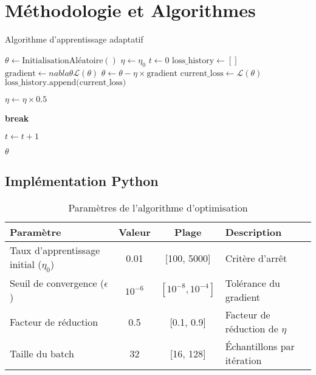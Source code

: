 \chapter{Méthodologie et Algorithmes}

\begin{algorithm}[H]
	\caption{Algorithme d'apprentissage adaptatif}
	\begin{algorithmic}[1]
			\State $\theta \gets \text{InitialisationAléatoire}()$
			\State $\eta \gets \eta_0$
			\State $t \gets 0$
			\State $\text{loss\_history} \gets []$
				\State $\text{gradient} \gets nabla\theta \mathcal{L}(\theta)$
				\State $\theta \gets \theta - \eta \times \text{gradient}$
				\State $\text{current\_loss} \gets \mathcal{L}(\theta)$
				\State $\text{loss\_history.append(current\_loss)}$	
							
					\State $\eta \gets \eta \times 0.5$ 
				\EndIf
				
					\State \textbf{break} 
				\EndIf
				
				\State $t \gets t+ 1$
			\EndWhile
			
			\State \Return $\theta$
		\EndProcedure
	\end{algorithmic}
	\label{alg:adaptive-optimization}
\end{algorithm}

\section{Implémentation Python}



\begin{table}[H]
	\centering
	\caption{Paramètres de l'algorithme d'optimisation}
	\begin{tabular}{p{6cm}ccp{4cm}}
		\toprule
		\textbf{Paramètre} & \textbf{Valeur} & \textbf{Plage} & \textbf{Description} \\
		\midrule
		Taux d'apprentissage initial ($\eta_0$) & 0.01 & [100, 5000] & Critère d'arrêt \\
		Seuil de convergence ($\epsilon$) & $10^{-6}$ & $[10^{-8}, 10^{-4}]$ & Tolérance du gradient \\
		Facteur de réduction & 0.5 & [0.1, 0.9] & Facteur de réduction de $\eta$ \\
		Taille du batch & 32 & [16, 128] & Échantillons par itération \\ 
		\bottomrule
	\end{tabular}
	\label{tab:optimization-parameters}
\end{table}

